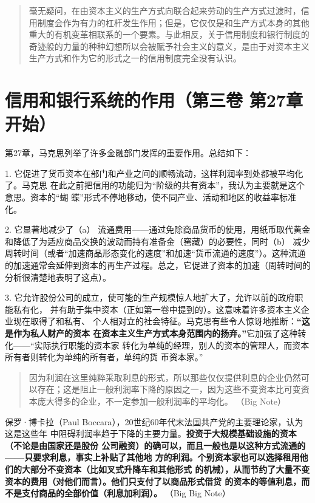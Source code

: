 \begin{quotation}
毫无疑问，在由资本主义的生产方式向联合起来劳动的生产方式过渡时，信用制度会作为有力的杠杆发生作用；但是，它仅仅是和生产方式本身的其他重大的有机变革相联系的一个要素。与此相反，关于信用制度和银行制度的奇迹般的力量的种种幻想所以会被赋予社会主义的意义，是由于对资本主义生产方式和作为它的形式之一的信用制度完全没有认识。 
\end{quotation}

\chapter{信用和银行系统的作用（第三卷 第27章开始）}

第27章，马克思列举了许多金融部门发挥的重要作用。总结如下：

1. 它促进了货币资本在部门和产业之间的顺畅流动，这样利润率到处都被平均化了。马克思
在此之前把信用的功能归为“阶级的共有资本”，我认为主要就是这个意思。资本的“蝴
蝶”形式不停地移动，使不同产业、活动和地区的收益率标准化。

2. 它显著地减少了（a） 流通费用——通过免除商品货币的使用，用纸币取代黄金和降低了为适应商品交换的波动而持有准备金（窖藏）的必要性，同时（b） 减少周转时间（或者“加速商品形态变化的速度”和加速“货币流通的速度”）。这种流通的加速通常会延伸到资本的再生产过程。总之，它促进了资本的加速（周转时间的分析很清楚地表明了这点）。

3. 它允许股份公司的成立，使可能的生产规模惊人地扩大了，允许以前的政府职能私有化，
并有助于集中资本（正如第一卷中提到的）。这意味着许多资本主义企业现在取得了和私有、
个人相对立的社会特征。马克思有些令人惊讶地推断：\textbf{“这是作为私人财产的资本
  在资本主义生产方式本身范围内的扬弃。”}它加强了这种转化——“实际执行职能的资本家
转化为单纯的经理，别人的资本的管理人，而资本所有者则转化为单纯的所有者，单纯的货
币资本家。”

\begin{quotation}
因为利润在这里纯粹采取利息的形式，所以那些仅仅提供利息的企业仍然可以存在；这是阻止一般利润率下降的原因之一，因为这些不变资本比可变资本庞大得多的企业，不一定参加一般利润率的平均化。 （Big Note）

\end{quotation}

保罗·博卡拉（Paul Boccara），20世纪60年代末法国共产党的主要理论家，认为这是这些年
中阻碍利润率趋于下降的主要力量。\textbf{投资于大规模基础设施的资本（不论是由国家还是股份
公司融资）的确可以，而且一般也是以这种方式流通的——只要求利息，事实上补贴了其他地
方的利润。个别资本家也可以选择租用他们的大部分不变资本（比如叉式升降车和其他形式
的机械），从而节约了大量不变资本的费用（对他们而言）。他们只支付了以商品形式借贷
的资本的等值利息，而不是支付商品的全部价值（利息加利润）。} （Big Big Note）

